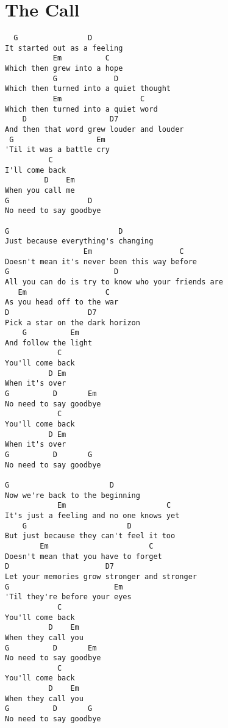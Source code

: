 \documentclass[leqno]{memoir}
\begin{document}
\chapter{The Call}
\begin{verbatim}
  G                D
It started out as a feeling
           Em          C
Which then grew into a hope
           G             D
Which then turned into a quiet thought
           Em                  C
Which then turned into a quiet word
    D                   D7
And then that word grew louder and louder
 G                   Em
'Til it was a battle cry
          C
I'll come back
         D    Em
When you call me
G                  D
No need to say goodbye

G                         D
Just because everything's changing
                  Em                    C
Doesn't mean it's never been this way before
G                        D
All you can do is try to know who your friends are
   Em                  C
As you head off to the war
D                  D7
Pick a star on the dark horizon
    G          Em
And follow the light
            C
You'll come back 
          D Em
When it's over
G          D       Em
No need to say goodbye
            C            
You'll come back 
          D Em
When it's over
G          D       G
No need to say goodbye

G                       D
Now we're back to the beginning
            Em                       C
It's just a feeling and no one knows yet
    G                       D
But just because they can't feel it too
        Em                       C
Doesn't mean that you have to forget
D                      D7
Let your memories grow stronger and stronger
G                        Em
'Til they're before your eyes
            C
You'll come back
          D    Em
When they call you
G          D       Em
No need to say goodbye
            C
You'll come back
          D    Em
When they call you
G          D       G
No need to say goodbye 

\end{verbatim}
\newpage
\end{document}
